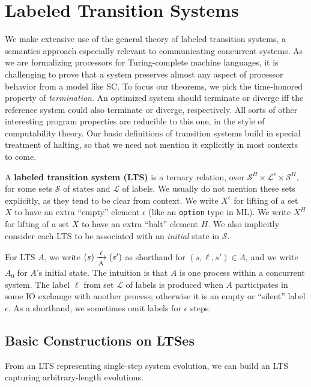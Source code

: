 \section{Labeled Transition Systems}\label{sec:lts}

We make extensive use of the general theory of labeled transition
systems, a semantics approach especially relevant to communicating
concurrent systems.  As we are formalizing processors for
Turing-complete machine languages, it is challenging to prove that a
system preserves almost any aspect of processor behavior from a model
like SC.  To focus our theorems, we pick the time-honored property of
\emph{termination}.  An optimized system should terminate or diverge
iff the reference system could also terminate or diverge,
respectively.  All sorts of other interesting program properties are
reducible to this one, in the style of computability theory.
Our basic definitions of transition systems build in
special treatment of halting, so that we need not mention it
explicitly in most contexts to come.

\begin{defn}
A \textbf{labeled transition system (LTS)} is a ternary relation, over
$\mathcal S^H \times \mathcal L^\epsilon \times \mathcal S^H$, for some sets
$\mathcal S$ of states and $\mathcal L$ of labels. We usually do not mention
these sets explicitly, as they tend to be clear from context. We write
$X^\epsilon$ for lifting of a set $X$ to have an extra ``empty'' element
$\epsilon$ (like an \texttt{option} type in ML). We write $X^H$ for lifting of
a set $X$ to have an extra ``halt'' element $H$. We also implicitly consider
each LTS to be associated with an \emph{initial} state in $\mathcal S$.
\end{defn}

For LTS $A$, we write $\io{A}{s}{s'}{\ell}$ as shorthand for $(s,
\ell, s') \in A$, and we write $A_0$ for $A$'s initial state. The
intuition is that $A$ is one process within a concurrent system. The
label $\ell$ from set $\mathcal L$ of labels is produced when $A$
participates in some IO exchange with another process; otherwise it is
an empty or ``silent'' label $\epsilon$.  As a shorthand, we sometimes
omit labels for $\epsilon$ steps.

\subsection{Basic Constructions on LTSes}

From an LTS representing single-step system evolution, we can build %
an LTS capturing arbitrary-length evolutions.

